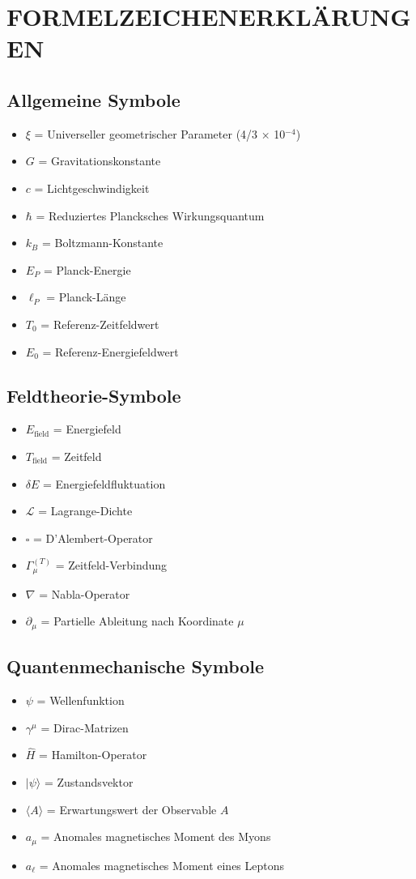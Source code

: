 \documentclass[12pt,a4paper]{article}
\begin{document}
	\section{FORMELZEICHENERKL\"{A}RUNGEN}
	
	\subsection{Allgemeine Symbole}
	\begin{itemize}
		\item $\xi$ = Universeller geometrischer Parameter (4/3 × 10$^{-4}$)
		\item $G$ = Gravitationskonstante
		\item $c$ = Lichtgeschwindigkeit
		\item $\hbar$ = Reduziertes Plancksches Wirkungsquantum
		\item $k_B$ = Boltzmann-Konstante
		\item $E_P$ = Planck-Energie
		\item $\ell_P$ = Planck-L\"{a}nge
		\item $T_0$ = Referenz-Zeitfeldwert
		\item $E_0$ = Referenz-Energiefeldwert
	\end{itemize}
	
	\subsection{Feldtheorie-Symbole}
	\begin{itemize}
		\item $E_{\text{field}}$ = Energiefeld
		\item $T_{\text{field}}$ = Zeitfeld
		\item $\delta E$ = Energiefeldfluktuation
		\item $\mathcal{L}$ = Lagrange-Dichte
		\item $\square$ = D'Alembert-Operator
		\item $\Gamma_\mu^{(T)}$ = Zeitfeld-Verbindung
		\item $\nabla$ = Nabla-Operator
		\item $\partial_\mu$ = Partielle Ableitung nach Koordinate $\mu$
	\end{itemize}
	
	\subsection{Quantenmechanische Symbole}
	\begin{itemize}
		\item $\psi$ = Wellenfunktion
		\item $\gamma^\mu$ = Dirac-Matrizen
		\item $\hat{H}$ = Hamilton-Operator
		\item $|\psi\rangle$ = Zustandsvektor
		\item $\langle A \rangle$ = Erwartungswert der Observable $A$
		\item $a_\mu$ = Anomales magnetisches Moment des Myons
		\item $a_\ell$ = Anomales magnetisches Moment eines Leptons
	\end{itemize}
	
\end{document}
